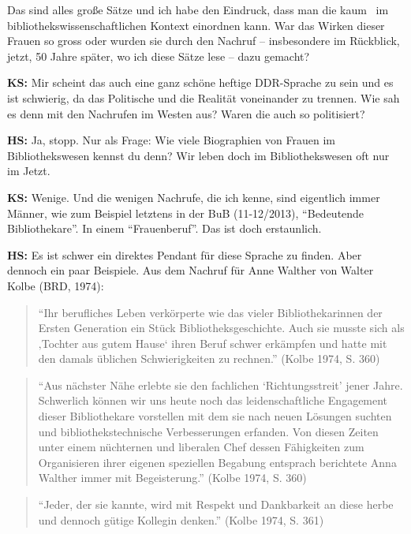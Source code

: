 \documentclass[a4paper,
fontsize=11pt,
oneside,
numbers=noperiodatend,
parskip=half-,
bibliography=totoc,
final
]{scrartcl}
\begin{document}
Das sind alles große Sätze und ich habe den Eindruck, dass man die kaum~
im bibliothekswissenschaftlichen Kontext einordnen kann. War das Wirken
dieser Frauen so gross oder wurden sie durch den Nachruf -- insbesondere
im Rückblick, jetzt, 50 Jahre später, wo ich diese Sätze lese -- dazu
gemacht?

\textbf{KS:} Mir scheint das auch eine ganz schöne heftige DDR-Sprache
zu sein und es ist schwierig, da das Politische und die Realität
voneinander zu trennen. Wie sah es denn mit den Nachrufen im Westen aus?
Waren die auch so politisiert?

\textbf{HS:} Ja, stopp. Nur als Frage: Wie viele Biographien von Frauen
im Bibliothekswesen kennst du denn? Wir leben doch im Bibliothekswesen
oft nur im Jetzt.

\textbf{KS:} Wenige. Und die wenigen Nachrufe, die ich kenne, sind
eigentlich immer Männer, wie zum Beispiel letztens in der BuB
(11-12/2013), \enquote{Bedeutende Bibliothekare}. In einem
\enquote{Frauenberuf}. Das ist doch erstaunlich.

\textbf{HS:} Es ist schwer ein direktes Pendant für diese Sprache zu
finden. Aber dennoch ein paar Beispiele. Aus dem Nachruf für Anne
Walther von Walter Kolbe (BRD, 1974):

\begin{quote}
\enquote{Ihr berufliches Leben verkörperte wie das vieler
Bibliothekarinnen der Ersten Generation ein Stück Bibliotheksgeschichte.
Auch sie musste sich als ‚Tochter aus gutem Hause` ihren Beruf schwer
erkämpfen und hatte mit den damals üblichen Schwierigkeiten zu rechnen.}
(Kolbe 1974, S. 360)
\end{quote}

\begin{quote}
\enquote{Aus nächster Nähe erlebte sie den fachlichen
\enquote{Richtungsstreit} jener Jahre. Schwerlich können wir uns heute
noch das leidenschaftliche Engagement dieser Bibliothekare vorstellen
mit dem sie nach neuen Lösungen suchten und bibliothekstechnische
Verbesserungen erfanden. Von diesen Zeiten unter einem nüchternen und
liberalen Chef dessen Fähigkeiten zum Organisieren ihrer eigenen
speziellen Begabung entsprach berichtete Anna Walther immer mit
Begeisterung.} (Kolbe 1974, S. 360)
\end{quote}

\begin{quote}
\enquote{Jeder, der sie kannte, wird mit Respekt und Dankbarkeit an
diese herbe und dennoch gütige Kollegin denken.} (Kolbe 1974, S. 361)
\end{quote}
\end{document}
